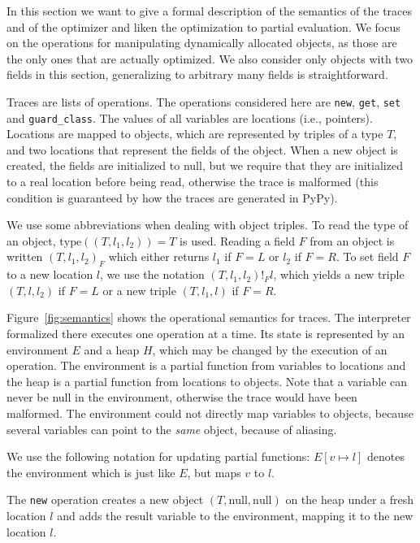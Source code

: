 \documentclass[preprint]{sigplanconf}
\newcommand\ie{i.e.,\xspace}
\begin{document}
In this section we want to give a formal description of the semantics of the
traces and of the optimizer and liken the optimization to partial evaluation.
We focus on the operations for manipulating dynamically allocated objects,
as those are the only ones that are actually optimized. We also consider only
objects with two fields in this section, generalizing to arbitrary many fields
is straightforward.

Traces are lists of operations. The operations considered here are
\lstinline{new}, \lstinline{get}, \lstinline{set} and \lstinline{guard_class}.
The values of all
variables are locations (\ie pointers). Locations are mapped to objects, which
are represented by triples of a type $T$, and two locations that represent the
fields of the object. When a new object is created, the fields are initialized
to null, but we require that they are initialized to a real
location before being read, otherwise the trace is malformed (this condition is
guaranteed by how the traces are generated in PyPy).

We use some abbreviations when dealing with object triples. To read the type of
an object, $\mathrm{type}((T,l_1,l_2))=T$ is used. Reading a field $F$ from an
object is written $(T,l_1,l_2)_F$ which either returns $l_1$ if $F=L$ or $l_2$
if $F=R$. To set field $F$ to a new location $l$, we use the notation
$(T,l_1,l_2)!_Fl$, which yields a new triple $(T,l,l_2)$ if $F=L$ or a new
triple $(T,l_1,l)$ if $F=R$.

Figure~\ref{fig:semantics} shows the operational semantics for traces. The
interpreter formalized there executes one operation at a time. Its state is
represented by an environment $E$ and a heap $H$, which may be changed by the
execution of an operation. The environment is a partial function from variables
to locations and the heap is a partial function from locations to objects. Note
that a variable can never be null in the environment, otherwise the trace would have
been malformed. The environment could not directly map variables to objects,
because several variables can point to the \emph{same} object, because of aliasing. 

We use the following notation for updating partial functions:
$E[v\mapsto l]$ denotes the environment which is just like $E$, but maps $v$ to
$l$.

The \lstinline{new} operation creates a new object $(T,\mathrm{null},\mathrm{null})$ on the
heap under a fresh location $l$ and adds the result variable to the environment,
mapping it to the new location $l$.
\end{document}
